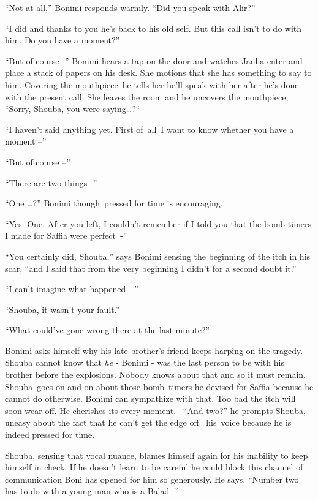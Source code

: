 \documentclass[twoside,11pt]{book}
\begin{document}
``Not at all,'' Bonimi responds warmly. ``Did you speak with Alir?''

``I did and thanks to you he's back to his old self. But this call isn't to do with him. Do you have a
moment?''

``But of course -'' Bonimi hears a tap on the door and watches Janha enter and place a stack
of papers on his desk. She motions that she has something to say to him. Covering the mouthpiece\ he tells her he'll
speak with her after he's done with the present call. She leaves the room and he uncovers the mouthpiece,
``Sorry, Shouba, you were saying{\dots}?``\ 

``I haven't said anything yet. First of\ all\ I want to know whether you have a moment --''

``But of course --'' 

``There are two things -''

``One {\dots}?'' Bonimi though~pressed for time is encouraging. 

``Yes. One. After you left, I couldn't remember if I told you that the bomb-timers I made for Saffia were
perfect~-'' 

``You certainly did, Shouba,'' says Bonimi sensing the beginning of the itch in his scar,
``and I said that from the very beginning I didn't for a second doubt it.''

``I can't imagine what happened - ''

``Shouba, it wasn't your fault.'' 

``What could've gone wrong there at the last minute?''

Bonimi asks himself why his late brother's friend keeps harping on the tragedy. Shouba cannot know that \textit{he} -
Bonimi - was the last person to be with his brother before the explosions. Nobody knows about that and so it must
remain. Shouba\ goes on and on about those bomb\ timers he devised for Saffia because he cannot do otherwise. Bonimi
can sympathize with that. Too bad the itch will soon wear off. He cherishes its every moment. ~``And
two?'' he prompts Shouba, uneasy about the fact that he can't get the edge off \ his\ voice because he is
indeed pressed for time.\ \ 

Shouba, sensing that vocal nuance, blames himself again for his inability to keep himself in check. If he doesn't learn
to be careful he could block this channel of communication Boni has opened for him so generously. He says,
``Number two has to do with a young man who is a Balad -''
\end{document}
